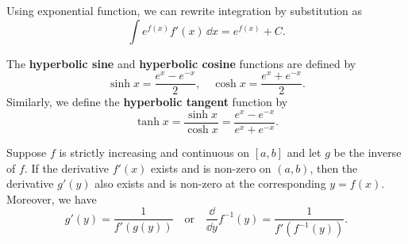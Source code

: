 	\begin{methodenv}
		Using exponential function, we can rewrite integration by substitution as
		\[
		\int e^{f(x)} f'(x)\, \dd x = e^{f(x)} + C.
		\]
	\end{methodenv}
	\begin{definitionenv}
		The \textbf{hyperbolic sine} and \textbf{hyperbolic cosine} functions are defined by
		\[
		\sinh x = \frac{e^x - e^{-x}}{2}, \quad \cosh x = \frac{e^x + e^{-x}}{2}.
		\]
		Similarly, we define the \textbf{hyperbolic tangent} function by
		\[
		\tanh x = \frac{\sinh x}{\cosh x} = \frac{e^x - e^{-x}}{e^x + e^{-x}}.
		\]
	\end{definitionenv}
    \begin{theoremenv}
        Suppose $f$ is strictly increasing and continuous on $[a,b]$ and let $g$ be the inverse of $f$. If the derivative $f'(x)$ exists and is non-zero on $(a,b)$, then the derivative $g'(y)$ also exists and is non-zero at the corresponding $y=f(x)$. Moreover, we have
        \[
        g'(y) = \frac{1}{f'(g(y))} \quad \text{or}\quad \frac{\dd}{\dd y} f^{-1}(y) = \frac{1}{f'(f^{-1}(y))}.
        \]
    \end{theoremenv}
